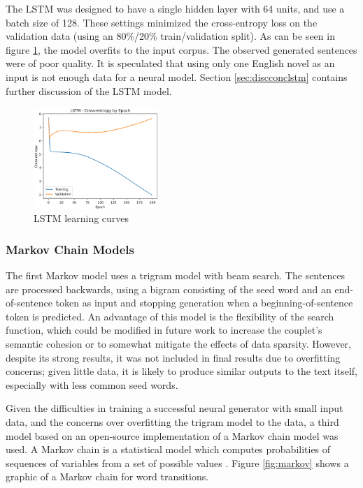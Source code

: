 \documentclass[11pt,a4paper]{article}
\begin{document}
The LSTM was designed to have a single hidden layer with 64 units, and use a batch size of 128. These settings minimized the cross-entropy loss on the validation data (using an 80\%/20\% train/validation split). As can be seen in figure \ref{fig:LearningCurves}, the model overfits to the input corpus. The observed generated sentences were of poor quality. It is speculated that using only one English novel as an input is not enough data for a neural model. Section \ref{sec:discconclstm} contains further discussion of the LSTM model.

\begin{figure}[h]
    \centering
    \includegraphics[width=0.42\textwidth]{LSTM_Loss.png}
    \caption{LSTM learning curves}
    \label{fig:LearningCurves}
\end{figure}


\subsubsection{Markov Chain Models}
\label{sec:markov}

The first Markov model uses a trigram model with beam search. The sentences are processed backwards, using a bigram consisting of the seed word and an end-of-sentence token as input and stopping generation when a beginning-of-sentence token is predicted. An advantage of this model is the flexibility of the search function, which could be modified in future work to increase the couplet’s semantic cohesion or to somewhat mitigate the effects of data sparsity. However, despite its strong results, it was not included in final results due to overfitting concerns; given little data, it is likely to produce similar outputs to the text itself, especially with less common seed words. 

Given the difficulties in training a successful neural generator with small input data, and the concerns over overfitting the trigram model to the data, a third model based on an open-source implementation of a Markov chain model was used. A Markov chain is a statistical model which computes probabilities of sequences of variables from a set of possible values \cite[Chapter~8]{jurafskymarkov}. Figure \ref{fig:markov} shows a graphic of a Markov chain for word transitions.
\end{document}
